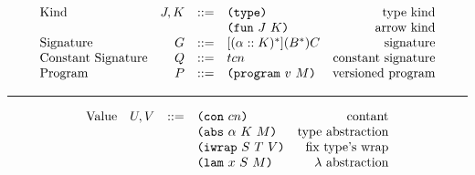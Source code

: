 \documentclass[../plutus-core-specification.tex]{subfiles}
\begin{document}
\begin{minipage}{\linewidth}
\[\begin{array}{lrclr}
        \textrm{Kind}             & J,K    & ::= & \texttt{(} \texttt{type} \texttt{)}{}                   & \textrm{type kind}\\
                                  &        &     & \texttt{(} \texttt{fun} ~ J ~ K \texttt{)}                & \textrm{arrow kind}\\
        \textrm{Signature}        & G      & ::= & [(\alpha :: K)^*](B^*)C     & \textrm{signature}\\
        \textrm{Constant Signature}   & Q      & ::= & tcn                    & \textrm{constant signature}\\
        \textrm{Program}          & P      & ::= & \texttt{(} \texttt{program} ~ v ~ M \texttt{)}             & \textrm{versioned program}\\

    \end{array}\]
    \label{fig:grammar_algorithmic_restricted}
\end{minipage}

\medskip\hrule\medskip

\begin{minipage}{\linewidth}
    \centering
    \[\begin{array}{lrclr}
        \textrm{Value}            & U, V   & ::= & \texttt{(} \texttt{con} ~ cn \texttt{)}                   & \textrm{contant}\\
                                  &        &     & \texttt{(} \texttt{abs} ~ \alpha ~ K ~ M \texttt{)}         & \textrm{type abstraction}\\
                                  &        &     & \texttt{(} \texttt{iwrap} ~ S ~ T ~ V \texttt{)}             & \textrm{fix type's wrap}\\
                                  &        &     & \texttt{(} \texttt{lam} ~ x ~ S ~ M \texttt{)}              & \textrm{$\lambda$ abstraction}\\
    \end{array}\]
    \label{fig:grammar_algorithmic_restricted:values}
\end{minipage}
\end{document}
